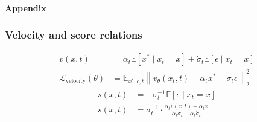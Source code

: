 \begin{frame}[t]
  \framesubtitle{Appendix}
  \frametitle{Velocity and score relations}
  \begin{align*}
    v(x,t)
    &= \dot{\alpha}_t \mathbb{E}[x^\ast \mid x_t=x] + \dot{\sigma}_t \mathbb{E}[\epsilon \mid x_t=x] \\
    \mathcal{L}_{\text{velocity}}(\theta)
    &= \mathbb{E}_{x^\ast,\epsilon,t}
    \left\|v_\theta(x_t,t)-\dot{\alpha}_t x^\ast-\dot{\sigma}_t \epsilon\right\|_2^2
  \end{align*}
  \begin{align*}
    s(x,t) &= -\sigma_t^{-1}\mathbb{E}[\epsilon\mid x_t=x] \\
    s(x,t) &= \sigma_t^{-1}\cdot
    \frac{\alpha_t v(x,t)-\dot{\alpha}_t x}
         {\dot{\alpha}_t \sigma_t - \alpha_t \dot{\sigma}_t}
  \end{align*}
  \vspace{0.1cm}
\end{frame}

